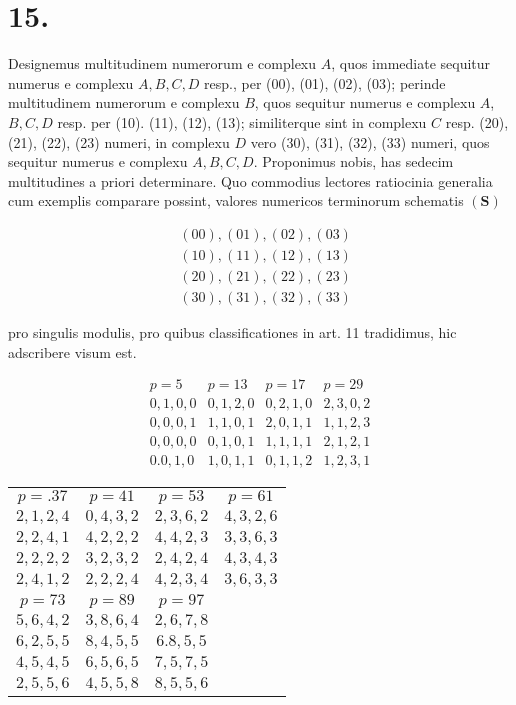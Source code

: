 \documentclass[10pt]{article}
\begin{document}
\section*{15.}
Designemus multitudinem numerorum e complexu \(A\), quos immediate sequitur numerus e complexu \(A, B, C, D\) resp., per (00), (01), (02), (03); perinde multitudinem numerorum e complexu \(B\), quos sequitur numerus e complexu \(A\), \(B, C, D\) resp. per (10). (11), (12), (13); similiterque sint in complexu \(C\) resp. (20), (21), (22), (23) numeri, in complexu \(D\) vero (30), (31), (32), (33) numeri, quos sequitur numerus e complexu \(A, B, C, D\). Proponimus nobis, has sedecim multitudines a priori determinare. Quo commodius lectores ratiocinia generalia cum exemplis comparare possint, valores numericos terminorum schematis \((\boldsymbol{S})\)

\[
\begin{aligned}
& (00),(01),(02),(03) \\
& (10),(11),(12),(13) \\
& (20),(21),(22),(23) \\
& (30),(31),(32),(33)
\end{aligned}
\]

pro singulis modulis, pro quibus classificationes in art. 11 tradidimus, hic adscribere visum est.

\[
\begin{array}{c|c|c|c}
p=5 & p=13 & p=17 & p=29 \\
0,1,0,0 & 0,1,2,0 & 0,2,1,0 & 2,3,0,2 \\
0,0,0,1 & 1,1,0,1 & 2,0,1,1 & 1,1,2,3 \\
0,0,0,0 & 0,1,0,1 & 1,1,1,1 & 2,1,2,1 \\
0.0,1,0 & 1,0,1,1 & 0,1,1,2 & 1,2,3,1
\end{array}
\]

\begin{center}
\begin{tabular}{c|c|c|c}
\(p=.37\) & \(p=41\) & \(p=53\) & \(p=61\) \\
\(2,1,2,4\) & \(0,4,3,2\) & \(2,3,6,2\) & \(4,3,2,6\) \\
\(2,2,4,1\) & \(4,2,2,2\) & \(4,4,2,3\) & \(3,3,6,3\) \\
\(2,2,2,2\) & \(3,2,3,2\) & \(2,4,2,4\) & \(4,3,4,3\) \\
\(2,4,1,2\) & \(2,2,2,4\) & \(4,2,3,4\) & \(3,6,3,3\) \\
\hline
\(p=73\) & \(p=89\) & \(p=97\) &  \\
\(5,6,4,2\) & \(3,8,6,4\) & \(2,6,7,8\) &  \\
\(6,2,5,5\) & \(8,4,5,5\) & \(6.8,5,5\) &  \\
\(4,5,4,5\) & \(6,5,6,5\) & \(7,5,7,5\) &  \\
\(2,5,5,6\) & \(4,5,5,8\) & \(8,5,5,6\) &  \\
\end{tabular}
\end{center}
\end{document}
